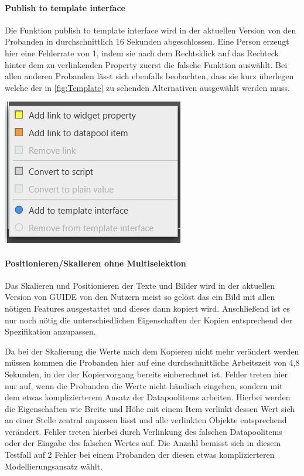\paragraph{Publish to template interface}
Die Funktion \glqq publish to template interface\grqq{} wird in der aktuellen Version von den Probanden in durchschnittlich 16 Sekunden abgeschlossen.
Eine Person erzeugt hier eine Fehlerrate von 1, indem sie nach dem Rechtsklick auf das Rechteck hinter dem zu verlinkenden Property zuerst die falsche Funktion auswählt.
Bei allen anderen Probanden lässt sich ebenfalls beobachten, dass sie kurz überlegen welche der in \ref{fig:Template} zu sehenden Alternativen ausgewählt werden muss.
\begin{center}
  \includegraphics[scale= 0.8]{figures/Template.PNG}
  \label{fig:Template}
\end{center}

\paragraph{Positionieren/Skalieren ohne Multiselektion}
Das Skalieren und Positionieren der Texte und Bilder wird in der aktuellen Version von GUIDE  von den Nutzern meist so gelöst das ein Bild mit allen nötigen Features ausgestattet und dieses dann kopiert wird.
Anschließend ist es nur noch nötig die unterschiedlichen Eigenschaften der Kopien entsprechend der Spezifikation anzupassen.

Da bei der Skalierung die Werte nach dem Kopieren nicht mehr verändert werden müssen kommen die Probanden hier auf eine durchschnittliche Arbeitszeit von 4,8 Sekunden, in der der Kopiervorgang bereits einberechnet ist.
Fehler treten hier nur auf, wenn die Probanden die Werte nicht händisch eingeben, sondern mit dem etwas komplizierterem Ansatz der Datapoolitems arbeiten.
Hierbei werden die Eigenschaften wie Breite und Höhe mit einem Item verlinkt dessen Wert sich an einer Stelle zentral anpassen lässt und alle verlinkten Objekte entsprechend verändert.
Fehler treten hierbei durch Verlinkung des falschen Datapoolitems oder der Eingabe des falschen Wertes auf.
Die Anzahl bemisst sich in diesem Testfall auf 2 Fehler bei einem Probanden der diesen etwas komplizierteren Modellierungsansatz wählt.

